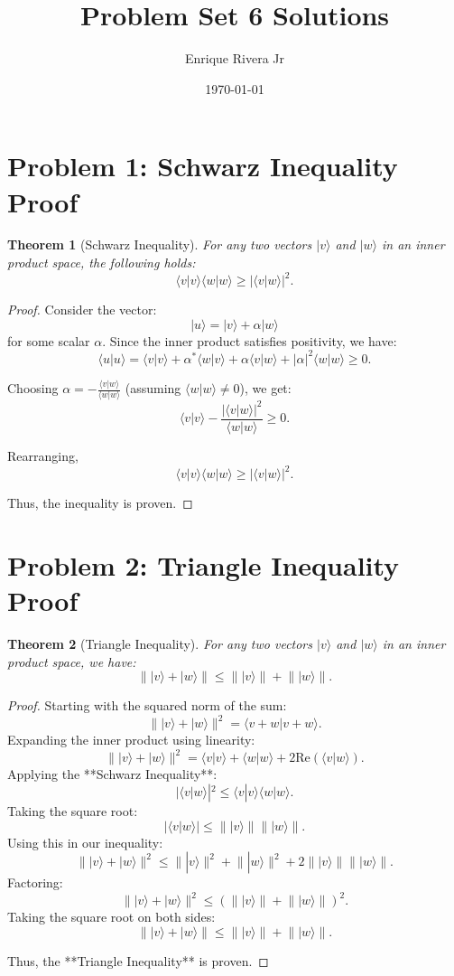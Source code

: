 \documentclass[12pt]{article}
\newtheorem{theorem}{Theorem}
\newcommand{\braket}[2]{\langle #1 | #2 \rangle}
\newcommand{\norm}[1]{\lVert #1 \rVert}
\begin{document}
\title{Problem Set 6 Solutions}
\author{Enrique Rivera Jr}
\date{\today}

\maketitle

\section*{Problem 1: Schwarz Inequality Proof}

\begin{theorem}[Schwarz Inequality]
For any two vectors \( |v\rangle \) and \( |w\rangle \) in an inner product space, the following holds:
\[
\braket{v}{v} \braket{w}{w} \geq |\braket{v}{w}|^2.
\]
\end{theorem}

\begin{proof}
Consider the vector:
\[
|u\rangle = |v\rangle + \alpha |w\rangle
\]
for some scalar \( \alpha \). Since the inner product satisfies positivity, we have:
\[
\braket{u}{u} = \braket{v}{v} + \alpha^* \braket{w}{v} + \alpha \braket{v}{w} + |\alpha|^2 \braket{w}{w} \geq 0.
\]

Choosing \( \alpha = -\frac{\braket{v}{w}}{\braket{w}{w}} \) (assuming \( \braket{w}{w} \neq 0 \)), we get:
\[
\braket{v}{v} - \frac{|\braket{v}{w}|^2}{\braket{w}{w}} \geq 0.
\]

Rearranging,
\[
\braket{v}{v} \braket{w}{w} \geq |\braket{v}{w}|^2.
\]

Thus, the inequality is proven.
\end{proof}





\section*{Problem 2: Triangle Inequality Proof}

\begin{theorem}[Triangle Inequality]
For any two vectors \( |v\rangle \) and \( |w\rangle \) in an inner product space, we have:
\[
\norm{|v\rangle + |w\rangle} \leq \norm{|v\rangle} + \norm{|w\rangle}.
\]
\end{theorem}

\begin{proof}
Starting with the squared norm of the sum:
\[
\norm{|v\rangle + |w\rangle}^2 = \braket{v + w}{v + w}.
\]
Expanding the inner product using linearity:
\[
\norm{|v\rangle + |w\rangle}^2 = \braket{v}{v} + \braket{w}{w} + 2\text{Re}(\braket{v}{w}).
\]
Applying the **Schwarz Inequality**:
\[
|\braket{v}{w}|^2 \leq \braket{v}{v} \braket{w}{w}.
\]
Taking the square root:
\[
|\braket{v}{w}| \leq \norm{|v\rangle} \norm{|w\rangle}.
\]
Using this in our inequality:
\[
\norm{|v\rangle + |w\rangle}^2 \leq \norm{|v\rangle}^2 + \norm{|w\rangle}^2 + 2\norm{|v\rangle} \norm{|w\rangle}.
\]
Factoring:
\[
\norm{|v\rangle + |w\rangle}^2 \leq (\norm{|v\rangle} + \norm{|w\rangle})^2.
\]
Taking the square root on both sides:
\[
\norm{|v\rangle + |w\rangle} \leq \norm{|v\rangle} + \norm{|w\rangle}.
\]

Thus, the **Triangle Inequality** is proven.
\end{proof}
\end{document}

